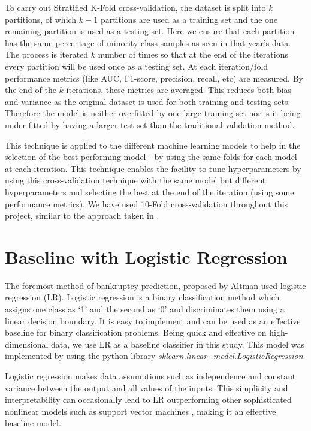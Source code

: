 To carry out Stratified K-Fold cross-validation, the dataset is split into $k$ partitions, of which $k-1$ partitions are used as a training set and the one remaining partition is used as a testing set. Here we ensure that each partition has the same percentage of minority class samples as seen in that year's data. 
The process is iterated $k$ number of times so that at the end of the iterations every partition will be used once as a testing set. 
At each iteration/fold performance metrics (like AUC, F1-score, precision, recall, etc) are measured. By the end of the $k$ iterations, these metrics are averaged. This reduces both bias and variance as the original dataset is used for both training and testing sets. Therefore the model is neither overfitted by one large training set nor is it being under fitted by having a larger test set than the traditional validation method. 

This technique is applied to the different machine learning models to help in the selection of the best performing model - by using the same folds for each model at each iteration. This technique enables the facility to tune hyperparameters by using this cross-validation technique with the same model but different hyperparameters and selecting the best at the end of the iteration (using some performance metrics). We have used 10-Fold cross-validation throughout this project, similar to the approach taken in \cite{liang2016financial}.




\section{Baseline with Logistic Regression}
\label{lrExplain}
The foremost method of bankruptcy prediction, proposed by Altman \cite{Altman} used logistic regression (LR). Logistic regression \cite{agresti2005bayesian} is a binary classification method which assigns one class as `1' and the second as `0' and discriminates them using a linear decision boundary. It is easy to implement and can be used as an effective baseline for binary classification problems. Being quick and effective on high-dimensional data, we use LR as a baseline classifier in this study. This model was implemented by using the python library \textit{sklearn.linear\_model.LogisticRegression}.

Logistic regression makes data assumptions such as independence and constant variance between the output and all values of the inputs. This simplicity and interpretability can occasionally lead to LR outperforming other sophisticated nonlinear models such as support vector machines \cite{kirasich2018random}, making it an effective baseline model.

